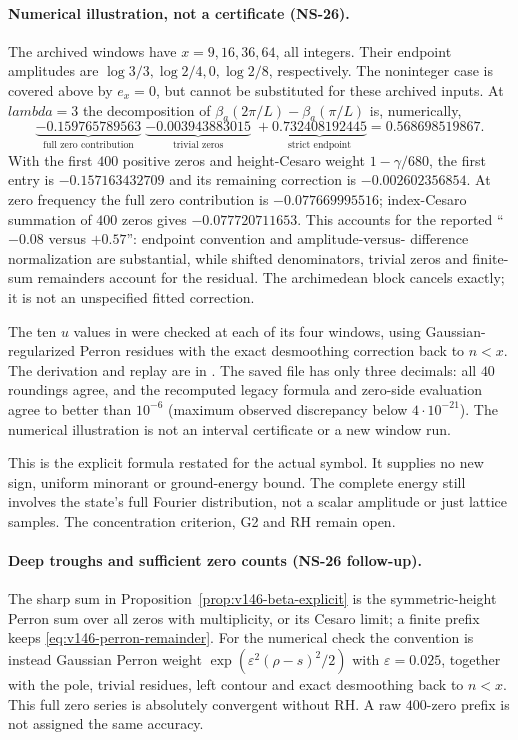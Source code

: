 \documentclass[11pt]{article}
\def\lambda{lambda}%
\theoremstyle{remark}
\begin{document}
\paragraph{Numerical illustration, not a certificate (NS-26).}
The archived windows have $x=9,16,36,64$, all integers. Their endpoint
amplitudes are $\log3/3,\log2/4,0,\log2/8$, respectively. The
noninteger case is covered above by $e_x=0$, but cannot be substituted
for these archived inputs. At $\lambda=3$ the decomposition of
$\beta_a(2\pi/L)-\beta_a(\pi/L)$ is, numerically,
\[
 \underbrace{-0.159765789563}_{\text{full zero contribution}}
 \;\underbrace{-0.003943883015}_{\text{trivial zeros}}
 \;+\underbrace{0.732408192445}_{\text{strict endpoint}}
 =0.568698519867.
\]
With the first $400$ positive zeros and height-Cesaro weight
$1-\gamma/680$, the first entry is $-0.157163432709$ and its remaining
correction is $-0.002602356854$. At zero frequency the full zero
contribution is $-0.077669995516$; index-Cesaro summation of $400$
zeros gives $-0.077720711653$. This accounts for the reported
``$-0.08$ versus $+0.57$'': endpoint convention and amplitude-versus-
difference normalization are substantial, while shifted denominators,
trivial zeros and finite-sum remainders account for the residual.
The archimedean block cancels exactly; it is not an unspecified fitted
correction.

The ten $u$ values in 
were checked at each of its four windows, using Gaussian-regularized
Perron residues with the exact desmoothing correction back to $n<x$.
The derivation and replay are in
. The saved file has only
three decimals: all $40$ roundings agree, and the recomputed legacy
formula and zero-side evaluation agree to better than $10^{-6}$
(maximum observed discrepancy below $4\cdot10^{-21}$). The numerical
illustration is not an interval certificate or a new window run.

This is the explicit formula restated for the actual symbol. It
supplies no new sign, uniform minorant or ground-energy bound. The
complete energy still involves the state's full Fourier distribution,
not a scalar amplitude or just lattice samples. The concentration
criterion, G2 and RH remain open.

\paragraph{Deep troughs and sufficient zero counts (NS-26 follow-up).}
The sharp sum in Proposition~\ref{prop:v146-beta-explicit} is the
symmetric-height Perron sum over all zeros with multiplicity, or its
Cesaro limit; a finite prefix keeps \eqref{eq:v146-perron-remainder}.
For the numerical check the convention is instead Gaussian Perron
weight $\exp(\varepsilon^2(\rho-s)^2/2)$ with
$\varepsilon=0.025$, together with the pole, trivial residues, left
contour and exact desmoothing back to $n<x$. This full zero series
is absolutely convergent without RH. A raw $400$-zero prefix is not
assigned the same accuracy.
\end{document}
